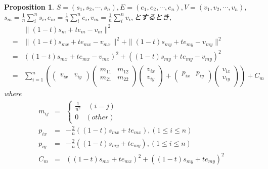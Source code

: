 \documentclass[8pt]{article}
\newtheorem{prop}{\bf Proposition}
\begin{document}
\begin{prop}
$S = (s_1,s_2,\cdots ,s_n),E = (e_1,e_2, \cdots ,e_n),V = (v_1,v_2,\cdots,v_n)$,\\
$s_m = \displaystyle \frac{1}{n}  \sum^n_{i}s_i,e_m = \frac{1}{n} \displaystyle \sum^n_{i}e_i,v_m = \frac{1}{n} \displaystyle \sum^n_{i}v_i,$とするとき,\\
\begin{eqnarray*}
&&\|(1-t)s_m + t e_m - v_m\|^2 \\
&=& \|(1-t)s_{mx} + t e_{mx} - v_{mx}\|^2 + \|(1-t)s_{my} + t e_{my} - v_{my}\|^2 \\
&=&((1-t)s_{mx} + t e_{mx} - v_{mx})^2 + ((1-t)s_{my} + t e_{my} - v_{my})^2\\
&=& 
\sum^n_{i=1}(
\left(
     \begin{array}{cc}
      v_{ix} & v_{iy} 
     \end{array}
  \right)
\left(
     \begin{array}{cc}
 	m_{11}&m_{12}\\
    	m_{21}&m_{22}\\
     \end{array}
  \right)
 \left(
     \begin{array}{c}
 	v_{ix}\\
	v_{iy}\\  
     \end{array}
  \right)+
\left(
     \begin{array}{ccccc}
      p_{ix} & p_{iy}\\ 
     \end{array}
  \right)
 \left(
     \begin{array}{c}
 	v_{ix}\\
	v_{iy}\\
     \end{array}
  \right) )+ C_m
\end{eqnarray*}
where\\
\begin{eqnarray*}
m_{ij} &=&
\begin{cases}
\frac{1}{n^2}\quad(i = j)\\
0\quad(other)
\end{cases}\\
p_{ix} &=& - \frac{2}{n}((1-t)s_{mx} + t e_{mx}),(1 \leq i \leq n)\\
p_{iy} &=& - \frac{2}{n}((1-t)s_{my} + t e_{my}),(1 \leq i \leq n)\\
C_m &=& ((1-t)s_{mx} + t e_{mx})^2 + ((1-t)s_{my} + t e_{my})^2
\end{eqnarray*}
\end{prop}
\end{document}
